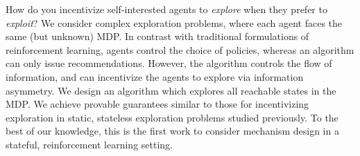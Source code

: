 How do you incentivize self-interested agents to \emph{explore} when they prefer to \emph{exploit}? We consider complex exploration problems, where each agent faces the same (but unknown) MDP. In contrast with traditional formulations of reinforcement learning, agents control the choice of policies, whereas an algorithm can only issue recommendations. However, the algorithm controls the flow of information, and can incentivize the agents to explore via information asymmetry. We design an algorithm which explores all reachable states in the MDP. We achieve provable guarantees similar to those for incentivizing exploration in static, stateless exploration problems studied previously. To the best of our knowledge, this is the first work to consider mechanism design in a stateful, reinforcement learning setting.










